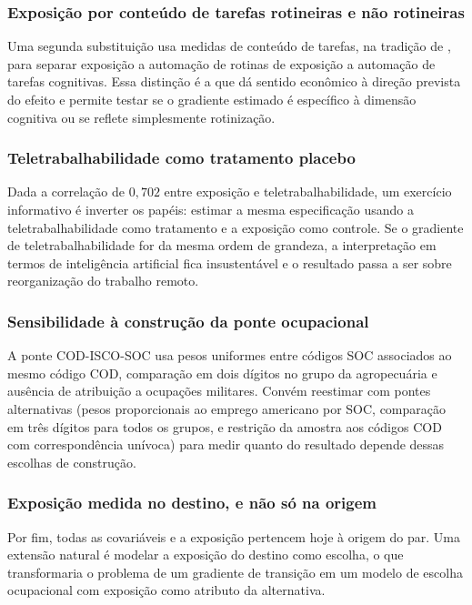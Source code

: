 \subsubsection{Exposição por conteúdo de tarefas rotineiras e não rotineiras}

Uma segunda substituição usa medidas de conteúdo de tarefas, na tradição de
, para separar exposição a automação de rotinas de
exposição a automação de tarefas cognitivas. Essa distinção é a que dá sentido
econômico à direção prevista do efeito e permite testar se o gradiente estimado
é específico à dimensão cognitiva ou se reflete simplesmente rotinização.

\subsubsection{Teletrabalhabilidade como tratamento placebo}

Dada a correlação de $0{,}702$ entre exposição e teletrabalhabilidade, um
exercício informativo é inverter os papéis: estimar a mesma especificação usando
a teletrabalhabilidade como tratamento e a exposição como controle. Se o
gradiente de teletrabalhabilidade for da mesma ordem de grandeza, a
interpretação em termos de inteligência artificial fica insustentável e o
resultado passa a ser sobre reorganização do trabalho remoto.

\subsubsection{Sensibilidade à construção da ponte ocupacional}

A ponte COD-ISCO-SOC usa pesos uniformes entre códigos SOC associados ao mesmo
código COD, comparação em dois dígitos no grupo da agropecuária e ausência de
atribuição a ocupações militares. Convém reestimar com pontes alternativas
(pesos proporcionais ao emprego americano por SOC, comparação em três dígitos
para todos os grupos, e restrição da amostra aos códigos COD com correspondência
unívoca) para medir quanto do resultado depende dessas escolhas de
construção.

\subsubsection{Exposição medida no destino, e não só na origem}

Por fim, todas as covariáveis e a exposição pertencem hoje à origem do par. Uma
extensão natural é modelar a exposição do destino como escolha, o que
transformaria o problema de um gradiente de transição em um modelo de escolha
ocupacional com exposição como atributo da alternativa.

